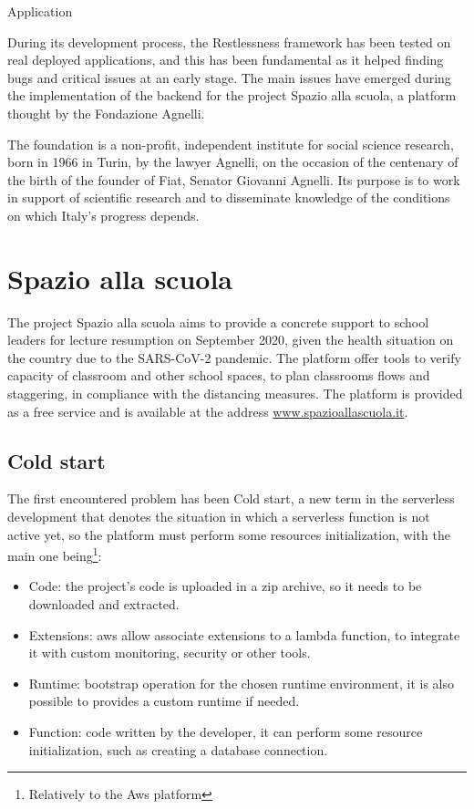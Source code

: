 \begin{chapter}{Application}
    \label{chap:application}

    During its development process, the Restlessness framework has been tested on
    real deployed applications, and this has been fundamental as it helped finding
    bugs and critical issues at an early stage.
    The main issues have emerged during the implementation of the backend for the
    project Spazio alla scuola, a platform thought by the Fondazione Agnelli.

    The foundation is a non-profit, independent institute for social science research,
    born in 1966 in Turin, by the lawyer Agnelli, on the occasion of the centenary
    of the birth of the founder of Fiat, Senator Giovanni Agnelli.
    Its purpose is to work in support of scientific research and to disseminate
    knowledge of the conditions on which Italy's progress depends.

    \section{Spazio alla scuola}
    The project Spazio alla scuola aims to provide a concrete support to school
    leaders for lecture resumption on September 2020, given the health situation on the
    country due to the SARS-CoV-2 pandemic.
    The platform offer tools to verify capacity of classroom and other school spaces,
    to plan classrooms flows and staggering, in compliance with the distancing measures.
    The platform is provided as a free service and is available at the address
    \url{www.spazioallascuola.it}.

    \subsection{Cold start}
    The first encountered problem has been Cold start, a new term in the serverless
    development that denotes the situation in which a serverless function is not
    active yet, so the platform must perform some resources initialization, with the
    main one being\footnote{Relatively to the Aws platform}:

    \begin{itemize}
        \item Code: the project's code is uploaded in a zip archive, so it needs to
            be downloaded and extracted.
        \item Extensions: aws allow associate extensions to a lambda function, to
            integrate it with custom monitoring, security or other tools.
        \item Runtime: bootstrap operation for the chosen runtime environment,
            it is also possible to provides a custom runtime if needed.
        \item Function: code written by the developer, it can perform some resource
            initialization, such as creating a database connection.
    \end{itemize}


\end{chapter}
